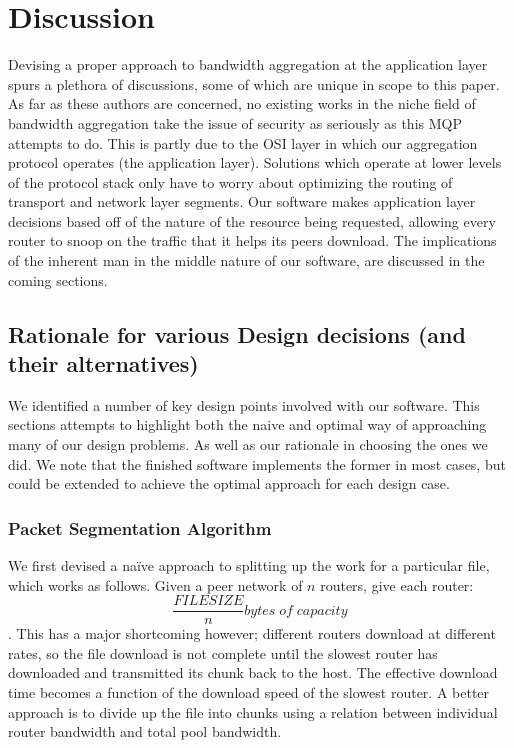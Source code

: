 \documentclass[12pt]{article}
\begin{document}
\newpage
\section{Discussion}
	
	Devising a proper approach to bandwidth aggregation at the application layer spurs a plethora of discussions, some of which are unique in scope to this paper. As far as these authors are concerned, no existing works in the niche field of bandwidth aggregation take the issue of security as seriously as this MQP attempts to do. This is partly due to the OSI layer in which our aggregation protocol operates (the application layer). Solutions which operate at lower levels of the protocol stack only have to worry about optimizing the routing of transport and network layer segments. Our software makes application layer decisions based off of the nature of the resource being requested, allowing every router to snoop on the traffic that it helps its peers download. The implications of the inherent man in the middle nature of our software, are discussed in the coming sections.

	\subsection{Rationale for various Design decisions (and their alternatives)}

		We identified a number of key design points involved with our software. This sections attempts to highlight both the naive and optimal way of approaching many of our design problems. As well as our rationale in choosing the ones we did. We note that the finished software implements the former in most cases, but could be extended to achieve the optimal approach for each design case. 

		\subsubsection{Packet Segmentation Algorithm}

			We first devised a na\"{i}ve approach to splitting up the work for a particular file, which works as follows. Given a peer network of $n$ routers, give each router: $$\frac{FILESIZE}{n} bytes\; of\; capacity$$. This has a major shortcoming however; different routers download at different rates, so the file download is not complete until the slowest router has downloaded and transmitted its chunk back to the host. The effective download time becomes a function of the download speed of the slowest router. A better approach is to divide up the file into chunks using a relation between individual router bandwidth and total pool bandwidth.
\end{document}
